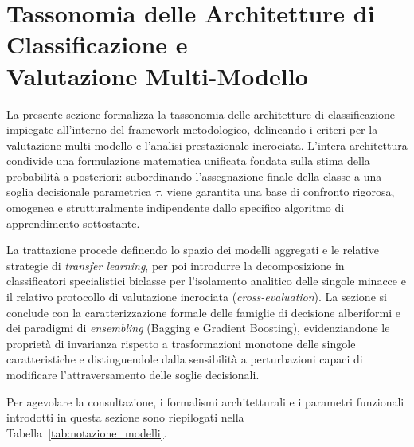 \section[Tassonomia delle Architetture di Classificazione e Valutazione Multi-Modello]{Tassonomia delle Architetture di Classificazione e\\Valutazione Multi-Modello}
\label{sec:tassonomia_modelli}

La presente sezione formalizza la tassonomia delle architetture di classificazione impiegate all'interno del framework metodologico, delineando i criteri per la valutazione multi-modello e l'analisi prestazionale incrociata. 
L'intera architettura condivide una formulazione matematica unificata fondata sulla stima della probabilità a posteriori: subordinando l'assegnazione finale della classe a una soglia decisionale parametrica $\tau$, viene garantita una base di confronto rigorosa, omogenea e strutturalmente indipendente dallo specifico algoritmo di apprendimento sottostante. 

La trattazione procede definendo lo spazio dei modelli aggregati e le relative strategie di \textit{transfer learning}, per poi introdurre la decomposizione in classificatori specialistici biclasse per l'isolamento analitico delle singole minacce e il relativo protocollo di valutazione incrociata (\textit{cross-evaluation}). La sezione si conclude con la caratterizzazione formale delle famiglie di decisione alberiformi e dei paradigmi di \textit{ensembling} (Bagging e Gradient Boosting), evidenziandone le proprietà di invarianza rispetto a trasformazioni monotone delle singole caratteristiche e distinguendole dalla sensibilità a perturbazioni capaci di modificare l'attraversamento delle soglie decisionali.

Per agevolare la consultazione, i formalismi architetturali e i parametri funzionali introdotti in questa sezione sono riepilogati nella Tabella~\ref{tab:notazione_modelli}.

